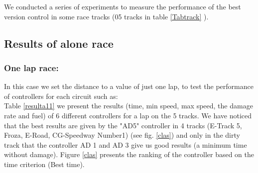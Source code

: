 \documentclass{llncs}
\begin{document}
We conducted a series of experiments to measure the performance of the best version control in some race tracks (05 tracks in table \ref{Tabtrack} ).

\subsection{Results of alone race}

\subsubsection{ One lap race:}
In this case we set the distance to a value of just one lap, to test the performance of controllers for each circuit such as:
\\

Table \ref{resulta11}  we present the results (time, min speed, max speed, the damage rate and fuel) of 6 different controllers for a lap on the 5 tracks. We have noticed that the best results are given by the "AD5" controller in 4 tracks (E-Track 5, Froza, E-Road, CG-Speedway Number1) (see fig. \ref{clas}) and only in the dirty track that the controller AD 1 and AD 3 give us good results (a minimum time without damage).
Figure \ref{clas} presents the ranking of the controller based on the time criterion (Best time).\\
\end{document}
